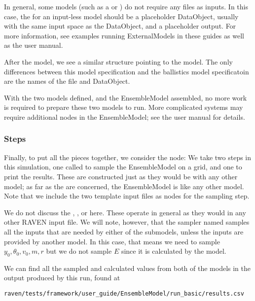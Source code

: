 In general, some models (such as a  or ) do not require any files as
inputs.  In this case, the  for an input-less model should be a placeholder DataObject,
usually with the same input space as the  DataObject, and a placeholder output.
For more information, see examples running ExternalModels in these guides as well as the user manual.

After the  model, we see a similar structure pointing to the  model.
The only differences between this model specification and the ballistics model specificatoin are the names of
the  file and  DataObject.

With the two models defined, and the EnsembleModel assembled, no more work is required to
prepare these two models to run.  More complicated systems may require additional nodes in the EnsembleModel;
see the user manual for details.

\subsubsection{Steps}
Finally, to put all the pieces together, we consider the  node:
We take two steps in this simulation, one  called  to sample the EnsembleModel on a grid,
and one  to print the results.  These are constructed just as they would be with any other
model; as far as the  are concerned, the EnsembleModel is like any other model.  Note that we
include the two template input files as  nodes for the sampling step.

We do not discuss the , , or 
here.  These operate in general as they would in any other RAVEN input file.  We will note, however, that the
 sampler named  samples all the inputs that are needed by either of the submodels,
unless the inputs are provided by another model.  In this case, that means we need to sample
$y_0,\theta_0,v_0,m,r$ but we do not sample $E$ since it is calculated by the  model.

We can find all the sampled and calculated values from both of the models in the output produced by this run,
found at
\begin{verbatim}
raven/tests/framework/user_guide/EnsembleModel/run_basic/results.csv
\end{verbatim}



